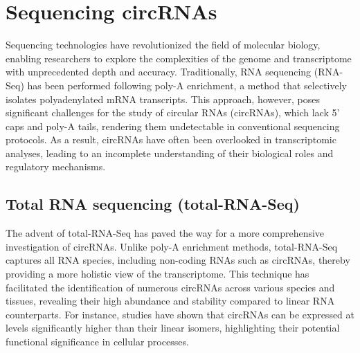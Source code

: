 \section{Sequencing circRNAs}

Sequencing technologies have revolutionized the field of molecular biology,
enabling researchers to explore the complexities of the genome and
transcriptome with unprecedented depth and accuracy.
Traditionally, RNA sequencing (RNA-Seq) has been performed following poly-A
enrichment, a method that selectively isolates polyadenylated mRNA transcripts.
This approach, however, poses significant challenges for the study of circular
RNAs (circRNAs), which lack 5' caps and poly-A tails, rendering them
undetectable in conventional sequencing protocols\supercite{guo_expanded_2014}.
As a result, circRNAs have often been overlooked in transcriptomic analyses,
leading to an incomplete understanding of their biological roles and regulatory
mechanisms.

\subsection{Total RNA sequencing (total-RNA-Seq)}
The advent of total-RNA-Seq has paved the way for a more comprehensive
investigation of circRNAs.
Unlike poly-A enrichment methods, total-RNA-Seq captures all RNA species,
including non-coding RNAs such as circRNAs, thereby providing a more holistic
view of the transcriptome\supercite{panda_identification_2017}.
This technique has facilitated the identification of numerous circRNAs across
various species and tissues, revealing their high abundance and stability
compared to linear RNA
counterparts\supercite{liu_circular_2016,cao_expression_2018}.
For instance, studies have shown that circRNAs can be expressed at levels
significantly higher than their linear isomers, highlighting their potential
functional significance in cellular processes\supercite{liu_circular_2016}.
